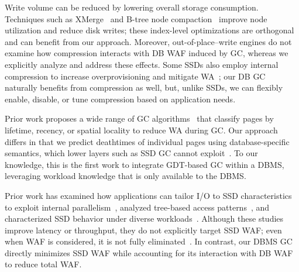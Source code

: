 Write volume can be reduced by lowering overall storage consumption.
Techniques such as XMerge~\cite{DBLP:conf/cidr/AlhomssiL21} and B-tree node compaction~\cite{DBLP:journals/access/LeeAL23} 
improve node utilization and reduce disk writes; these index-level optimizations are orthogonal and can benefit from our approach.
Moreover, out-of-place--write engines do not examine how compression interacts with DB WAF induced by GC, whereas we explicitly analyze and address these effects.
Some SSDs also employ internal compression to increase overprovisioning and mitigate WA~\cite{DBLP:conf/osdi/ZuckTSH14}; 
our DB GC naturally benefits from compression as well, but, unlike SSDs, we can flexibly enable, disable, or tune compression based on application needs.


Prior work proposes a wide range of GC algorithms~\cite{DBLP:conf/eurosys/ZhouWHHXZ15, DBLP:journals/corr/DayanB15, DBLP:conf/fast/MinKCLE12, DBLP:journals/cacm/LangeNY23, DBLP:journals/tos/Desnoyers14, DBLP:conf/fast/LeeSHC15, lockv, DBLP:journals/tos/LuPGAA17, DBLP:journals/pvldb/YuMKLMK22, DBLP:journals/pe/Houdt14, DBLP:conf/hotstorage/ShafaeiDF16} 
that classify pages by lifetime, recency, or spatial locality to reduce WA during GC.
Our approach differs in that we predict deathtimes of individual pages using database-specific semantics, 
which lower layers such as SSD GC cannot exploit~\cite{DBLP:journals/cacm/LangeNY23,DBLP:conf/eurosys/HeKAA17, DBLP:journals/pomacs/LangeNY25}.
To our knowledge, this is the first work to integrate GDT-based GC within a DBMS, leveraging workload knowledge that is only available to the DBMS.

Prior work has examined how applications can tailor I/O to SSD characteristics to exploit internal parallelism~\cite{DBLP:conf/eurosys/HeKAA17, DBLP:journals/pvldb/KakaraparthyPPK19, DBLP:journals/pvldb/HeXLJZYML23}, analyzed tree-based access patterns~\cite{DBLP:journals/pvldb/DidonaISK20}, and characterized SSD behavior under diverse workloads~\cite{DBLP:journals/tos/YadgarGJS21, DBLP:conf/hotstorage/YadgarG16}.
Although these studies improve latency or throughput, they do not explicitly target SSD WAF; even when WAF is considered, it is not fully eliminated~\cite{DBLP:conf/osdi/YangPGTS14, DBLP:conf/fast/Curtis-MauryKRM24}.
In contrast, our DBMS GC directly minimizes SSD WAF while accounting for its interaction with DB WAF to reduce total WAF.

